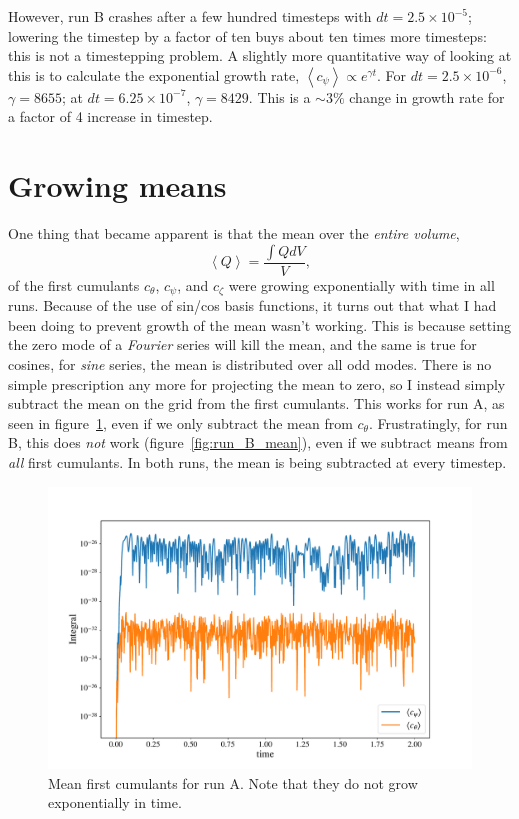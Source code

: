 \documentclass{jfm}
\begin{document}
However, run B crashes after a few hundred timesteps with $dt = 2.5\times 10^{-5}$; lowering the timestep by a factor of ten buys about ten times more timesteps:
this is not a timestepping problem.
A slightly more quantitative way of looking at this is to calculate the exponential growth rate, $\left<c_\psi\right> \propto e^{\gamma t}$.
For $dt = 2.5\times 10^{-6}$, $\gamma = 8655$; at $dt = 6.25\times 10^{-7}$, $\gamma = 8429$.
This is a $\sim 3 \%$ change in growth rate for a factor of 4 increase in timestep.



\section{Growing means}
\label{sec:means}

One thing that became apparent is that the mean over the \emph{entire volume}, 
\begin{equation}
  \label{eq:mean}
  \left< Q\right> = \frac{\int Q dV}{V},
\end{equation}
of the first cumulants $c_\theta$, $c_\psi$, and $c_\zeta$ were growing exponentially with time in all runs.
Because of the use of sin/cos basis functions, it turns out that what I had been doing to prevent growth of the mean wasn't working.
This is because setting the zero mode of a \emph{Fourier} series will kill the mean, and the same is true for cosines, for \emph{sine} series, the mean is distributed over all odd modes.
There is no simple prescription any more for projecting the mean to zero, so I instead simply subtract the mean on the grid from the first cumulants.
This works for run A, as seen in figure~\ref{fig:run_A_mean}, even if we only subtract the mean from $c_\theta$. 
Frustratingly, for run B, this does \emph{not} work (figure~\ref{fig:run_B_mean}), even if we subtract means from \emph{all} first cumulants.
In both runs, the mean is being subtracted at every timestep.
%
\begin{figure}
  \centering
  \includegraphics[width=\textwidth]{run_A_integrals.pdf}
  \caption{Mean first cumulants for run A. Note that they do not grow exponentially in time.}
    \label{fig:run_A_mean}
\end{figure}
\end{document}
